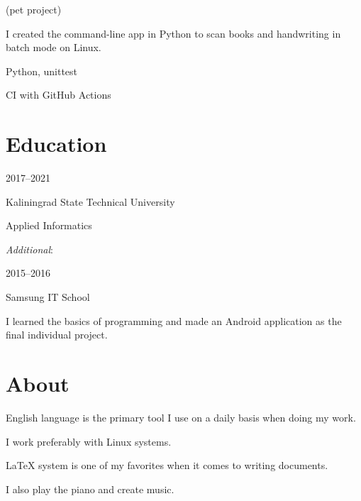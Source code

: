 \documentclass [12pt] {article}
\newcommand \CloserUnderline [1] {\underline {\smash {#1}}}
\begin{document}
\href {https://pypi.org/project/smth} {\CloserUnderline {smth}}
(pet project)

I created the command-line app in Python to scan books and handwriting in
batch mode on Linux.

\medskip

Python, unittest

CI with GitHub Actions

\section {Education}

2017--2021

Kaliningrad State Technical University

Applied Informatics

\bigskip

\emph {Additional}:

2015--2016

Samsung IT School

I learned the basics of programming
and made an Android application as the final individual project.

\section {About}

English language is the primary tool
I use on a daily basis when doing my work.

I work preferably with Linux systems.

LaTeX system is one of my favorites
when it comes to writing documents.

I also play the piano and create music.
\end{document}
